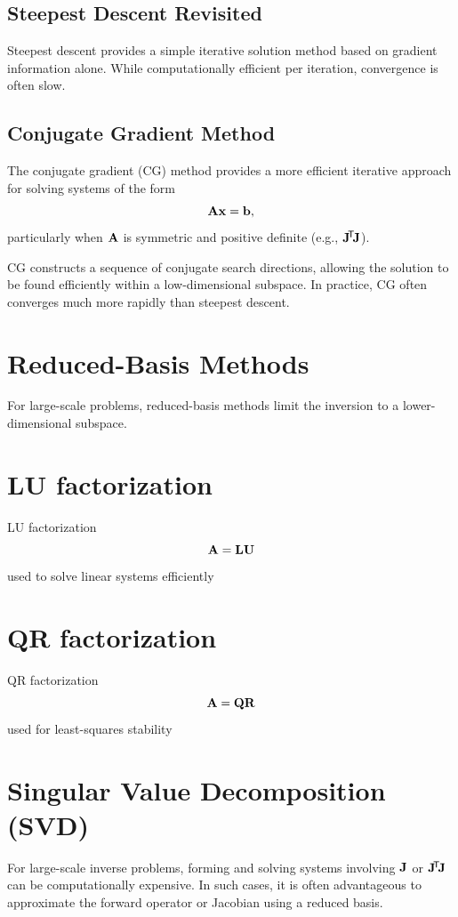 \subsection{Steepest Descent Revisited}

Steepest descent provides a simple iterative solution method based on gradient information alone. While computationally efficient per iteration, convergence is often slow.

\subsection{Conjugate Gradient Method}

The conjugate gradient (CG) method provides a more efficient iterative approach for solving systems of the form
\[
    \vb{A} \vb{x} = \vb{b},
\]
particularly when $\vb{A}$ is symmetric and positive definite (e.g., $\vb{J}\!^\mathsf{T}\! \vb{J}$).

CG constructs a sequence of conjugate search directions, allowing the solution to be found efficiently within a low-dimensional subspace. In practice, CG often converges much more rapidly than steepest descent.

\section{Reduced-Basis Methods}

For large-scale problems, reduced-basis methods limit the inversion to a lower-dimensional subspace.


\section{LU factorization}

LU factorization
\[
    \vb{A} = \vb{L}\vb{U}
\]
used to solve linear systems efficiently


\section{QR factorization}

QR factorization
\[
    \vb{A} = \vb{Q}\vb{R}
\]
used for least-squares stability

\section{Singular Value Decomposition (SVD)}

For large-scale inverse problems, forming and solving systems involving $\vb{J}$ or $\vb{J}\!^\mathsf{T}\! \vb{J}$ can be computationally expensive. In such cases, it is often advantageous to approximate the forward operator or Jacobian using a reduced basis.

